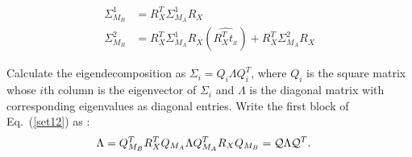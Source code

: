 \documentclass[twocolumn,10pt]{asme2ej}
\begin{document}
\begin{subequations} 
\begin{align}
\Sigma_{M_B}^1 &=  R^T_X \Sigma_{M_A}^1 R_X \label{set11} \\
\Sigma_{M_B}^2 &=  R^T_X \Sigma_{M_A}^1 R_X(\widehat{R^T_X t_x}) + R^T_X \Sigma_{M_A}^2 R_X  \label{set12}
\end{align}
\end{subequations}

Calculate the eigendecomposition as $ \Sigma_{i}=Q_i \Lambda Q_i^T$, where $Q_i$ is the square matrix whose $i$th column is the eigenvector of $\Sigma_i$ and $\Lambda$ is the diagonal matrix with corresponding eigenvalues as diagonal entries. Write the first block of Eq.~(\ref{set12}) as \cite{ackermanGSI, ackermanIROS2013}:
\begin{align}
\Lambda &= Q_{M_B}^T R_X^T Q_{M_A} \Lambda Q_{M_A}^T R_X Q_{M_B} = {\cal Q} \Lambda {\cal Q}^T.
\label{QAQ}
\end{align}

\end{document}
